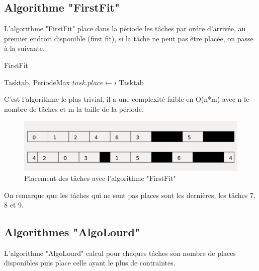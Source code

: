 \documentclass[11pt]{article}
\begin{document}
\subsection{Algorithme "FirstFit"}
L'algorithme "FirstFit" place dans la période les tâches par ordre d'arrivée, au premier endroit disponible (first fit), si la tâche ne peut pas être placée, on passe à la suivante.

\begin{algorithm}
    \caption{FirstFit}
    \begin{algorithmic}
    \REQUIRE Tasktab, PeriodeMax
            \STATE $task.place \leftarrow i$
         \ENDIF
        \ENDFOR
    \ENDFOR
    \RETURN Tasktab
    \end{algorithmic}
\end{algorithm}

C'est l'algorithme le plus trivial, il a une complexité faible en O(n*m) avec n le nombre de tâches et m la taille de la période.

\begin{figure}[H]
    \centering
    \includegraphics[scale = 0.35]{FirstFit}
    \caption{Placement des tâches avec l'algorithme "FirstFit"}
\end{figure}

\noindent On remarque que les tâches qui ne sont pas places sont les dernières, les tâches 7, 8 et 9.

\subsection{Algorithmes "AlgoLourd"}
L'algorithme "AlgoLourd" calcul pour chaques tâches son nombre de places disponibles puis place celle ayant le plus de contraintes.
\end{document}
